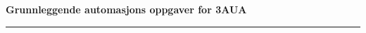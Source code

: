 \centerline
\Huge
\textbf{Grunnleggende automasjons oppgaver for 3AUA}  \bigskip
\normalsize
\bigskip 
\hrule
\vfil \eject
